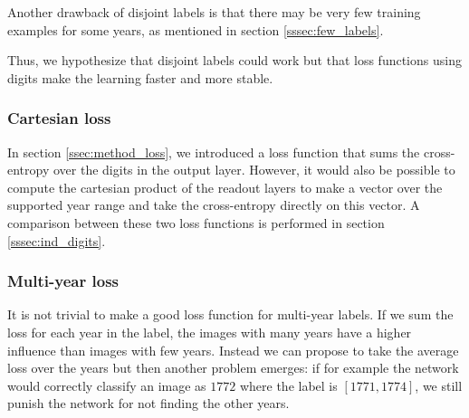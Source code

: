 Another drawback of disjoint labels is that there may be very few training examples for some years, as mentioned in section \ref{sssec:few_labels}.

Thus, we hypothesize that disjoint labels could work but that loss functions using digits make the learning faster and more stable.



\subsubsection{Cartesian loss} \label{sssec:cartesian}

%


In section \ref{ssec:method_loss}, we introduced a loss function that sums the cross-entropy over the digits in the output layer. However, it would also be possible to 
compute the cartesian product of the readout layers to make a vector over the supported year range and take the cross-entropy directly on this vector. A comparison between these two loss functions is performed in section \ref{sssec:ind_digits}.

\newpage
\subsubsection{Multi-year loss} \label{sssec:alt_multiyear}

It is not trivial to make a good loss function for multi-year labels. If we sum the loss for each year in the label, the images with many years have a higher influence than images with few years. Instead we can propose to take the average loss over the years but then another problem emerges: if for example the network would correctly classify an image as $1772$ where the label is $[1771, 1774]$, we still punish the network for not finding the other years.

